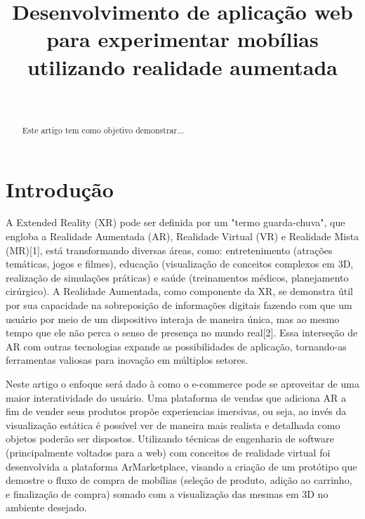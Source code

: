 \documentclass[conference]{IEEEtran}
\begin{document}
\title{Desenvolvimento de aplicação web para experimentar mobílias utilizando realidade aumentada\\
}

\author{
   \\

}

\maketitle

\begin{abstract}
  Este artigo tem como objetivo demonstrar...
\end{abstract}

\section{Introdução}
A Extended Reality (XR) pode ser definida por um "termo guarda-chuva", que
engloba a Realidade Aumentada (AR), Realidade Virtual (VR) e Realidade Mista
(MR)[1], está transformando diversas áreas, como: entretenimento (atrações
temáticas, jogos e filmes), educação (visualização de conceitos complexos em
3D, realização de simulações práticas) e saúde (treinamentos médicos,
planejamento cirúrgico). A Realidade Aumentada, como componente da XR, se
demonstra útil por sua capacidade na sobreposição de informações digitais
fazendo com que um usuário por meio de um dispositivo interaja de maneira
única, mas ao mesmo tempo que ele não perca o senso de presença no mundo
real[2]. Essa interseção de AR com outras tecnologias expande as possibilidades
de aplicação, tornando-as ferramentas valiosas para inovação em múltiplos
setores.

\text{}
Neste artigo o enfoque será dado à como o e-commerce
pode se aproveitar de uma maior interatividade do usuário. Uma plataforma de vendas
que adiciona AR a fim de vender seus produtos propõe experiencias imersivas, ou seja,
ao invés da visualização estática é possível ver de maneira mais realista e detalhada
como objetos poderão ser dispostos. Utilizando técnicas de engenharia de software
(principalmente voltados para a web) com conceitos de realidade virtual foi desenvolvida
a plataforma ArMarketplace, visando a criação de um protótipo que demostre o fluxo de
compra de mobílias (seleção de produto, adição ao carrinho, e finalização de compra)
somado com a visualização das mesmas em 3D no ambiente desejado.
\end{document}
